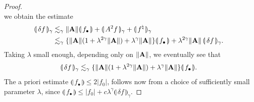 \documentclass[11pt,a4paper]{amsart}
\renewcommand{\leq}{\leqslant}
\theoremstyle{plain}%
\theoremstyle{definition}
\theoremstyle{remark}
\numberwithin{equation}{section} %
\begin{document}
\begin{proof}
$$$$
we obtain the estimate
\begin{equation*}
\begin{split}
\llparenthesis\, \delta f \,\rrparenthesis_\gamma &\lesssim_{\gamma} \| {\bf A} \|\llparenthesis\,f_\bullet \,\rrparenthesis + \llparenthesis\, A^2 f\,\rrparenthesis_\gamma + \llparenthesis\, f^{\natural}\,\rrparenthesis_\gamma \\
                            &\lesssim_{\gamma} \{\| {\bf A} \| (1 + \lambda^{2 \gamma}\| {\bf A} \|) + \lambda^\gamma \| {\bf A} \|\} \llparenthesis\, f_\bullet \,\rrparenthesis + \lambda^{2 \gamma}\| {\bf A} \|\,\llparenthesis\, \delta f \,\rrparenthesis_{\gamma}.
\end{split}
\end{equation*}
Taking $\lambda$ small enough, depending only on $\| \bf A \|$, we eventually see that 
$$ 
\llparenthesis\,\delta f \,\rrparenthesis_\gamma \lesssim_{\gamma}\{\| {\bf A} \| (1 +  \lambda^{2 \gamma} \| {\bf A} \|) + \lambda^\gamma  \| {\bf A} \|\} \llparenthesis\, f_\bullet\,\rrparenthesis.
$$
The a priori estimate $\llparenthesis\, f _\bullet\,\rrparenthesis \leqslant 2 | f_0 |$, follows now from a choice of sufficiently small  parameter $\lambda$, since $\llparenthesis\,f_\bullet \,\rrparenthesis \leq | f_0 | + c \lambda^\gamma \llparenthesis\, \delta f \,\rrparenthesis _\gamma$.

\bigskip


\end{proof}
\end{document}
